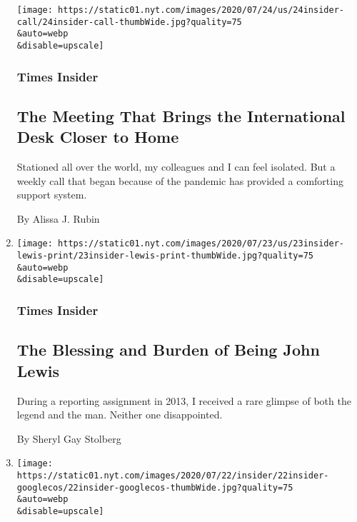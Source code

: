 \begin{enumerate}
  \texttt{[image: https://static01.nyt.com/images/2020/07/24/us/24insider-call/24insider-call-thumbWide.jpg?quality=75\\\&auto=webp\\\&disable=upscale]}

  \hypertarget{times-insider-5}{%
  \subsubsection{Times Insider}\label{times-insider-5}}

  \hypertarget{the-meeting-that-brings-the-international-desk-closer-to-home}{%
  \subsection{The Meeting That Brings the International Desk Closer to
  Home}\label{the-meeting-that-brings-the-international-desk-closer-to-home}}

  Stationed all over the world, my colleagues and I can feel isolated.
  But a weekly call that began because of the pandemic has provided a
  comforting support system.

  By Alissa J. Rubin
\item
  \href{/2020/07/23/insider/john-lewis-memory.html}{}

  \texttt{[image: https://static01.nyt.com/images/2020/07/23/us/23insider-lewis-print/23insider-lewis-print-thumbWide.jpg?quality=75\\\&auto=webp\\\&disable=upscale]}

  \hypertarget{times-insider-6}{%
  \subsubsection{Times Insider}\label{times-insider-6}}

  \hypertarget{the-blessing-and-burden-of-being-john-lewis}{%
  \subsection{The Blessing and Burden of Being John
  Lewis}\label{the-blessing-and-burden-of-being-john-lewis}}

  During a reporting assignment in 2013, I received a rare glimpse of
  both the legend and the man. Neither one disappointed.

  By Sheryl Gay Stolberg
\item
  \href{/2020/07/21/insider/new-york-times-google-docs.html}{}

  \texttt{[image: https://static01.nyt.com/images/2020/07/22/insider/22insider-googlecos/22insider-googlecos-thumbWide.jpg?quality=75\\\&auto=webp\\\&disable=upscale]}


\end{enumerate}
